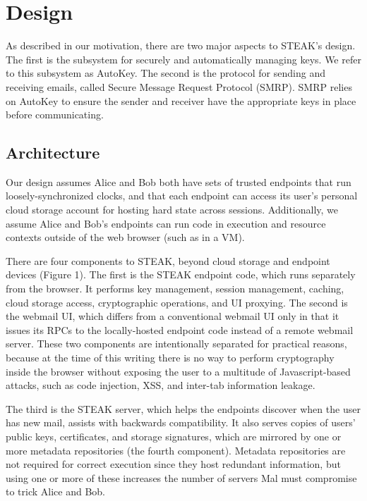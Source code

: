 \section{Design}

As described in our motivation, there are two major aspects to STEAK’s design.  The first is the subsystem for securely and automatically managing keys.  We refer to this subsystem as AutoKey.  The second is the protocol for sending and receiving emails, called Secure Message Request Protocol (SMRP).  SMRP relies on AutoKey to ensure the sender and receiver have the appropriate keys in place before communicating.

\subsection{Architecture}
Our design assumes Alice and Bob both have sets of trusted endpoints that run loosely-synchronized clocks, and that each endpoint can access its user’s personal cloud storage account for hosting hard state across sessions.  Additionally, we assume Alice and Bob's endpoints can run code in execution and resource contexts outside of the web browser (such as in a VM).

There are four components to STEAK, beyond cloud storage and endpoint devices (Figure 1). The first is the STEAK endpoint code, which runs separately from the browser.  It performs key management, session management, caching, cloud storage access, cryptographic operations, and UI proxying. The second is the webmail UI, which differs from a conventional webmail UI only in that it issues its RPCs to the locally-hosted endpoint code instead of a remote webmail server.  These two components are intentionally separated for practical reasons, because at the time of this writing there is no way to perform cryptography inside the browser without exposing the user to a multitude of Javascript-based attacks, such as code injection, XSS, and inter-tab information leakage.

The third is the STEAK server, which helps the endpoints discover when the user has new mail, assists with backwards compatibility.  It also serves copies of users’ public keys, certificates, and storage signatures, which are mirrored by one or more metadata repositories (the fourth component).  Metadata repositories are not required for correct execution since they host redundant information, but using one or more of these increases the number of servers Mal must compromise to trick Alice and Bob.

